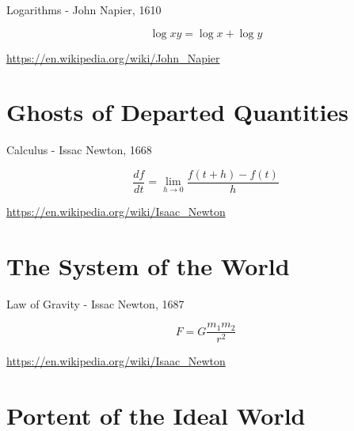 \documentclass[12pt]{article}
\begin{document}
Logarithms - John Napier, 1610

\vspace{2em}

\begin{equation*} \log xy = \log x + \log y \end{equation*}

\vspace{2em}

\url{https://en.wikipedia.org/wiki/John_Napier}

\newpage


\section{Ghosts of Departed Quantities}
	
Calculus - Issac Newton, 1668

\vspace{2em}

\begin{equation*} \frac{df}{dt} =\lim_{h \to 0}  \frac{f(t + h) - f(t)}{h} \end{equation*}

\vspace{2em}


\url{https://en.wikipedia.org/wiki/Isaac_Newton}

\newpage


\section{The System of the World}

Law of Gravity - Issac Newton, 1687

\vspace{2em}

\begin{equation*}F = G \frac{m_1 m_2}{r^2}\end{equation*}


\vspace{2em}

\url{https://en.wikipedia.org/wiki/Isaac_Newton}

\newpage


\section{Portent of the Ideal World}
\end{document}
